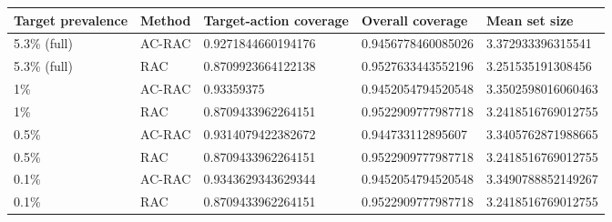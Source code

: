 \begin{tabular}{lllll}
\toprule
Target prevalence & Method & Target-action coverage & Overall coverage & Mean set size \\
\midrule
5.3\% (full) & AC-RAC & 0.9271844660194176 & 0.9456778460085026 & 3.372933396315541 \\
5.3\% (full) & RAC & 0.8709923664122138 & 0.9527633443552196 & 3.251535191308456 \\
1\% & AC-RAC & 0.93359375 & 0.9452054794520548 & 3.3502598016060463 \\
1\% & RAC & 0.8709433962264151 & 0.9522909777987718 & 3.2418516769012755 \\
0.5\% & AC-RAC & 0.9314079422382672 & 0.944733112895607 & 3.3405762871988665 \\
0.5\% & RAC & 0.8709433962264151 & 0.9522909777987718 & 3.2418516769012755 \\
0.1\% & AC-RAC & 0.9343629343629344 & 0.9452054794520548 & 3.3490788852149267 \\
0.1\% & RAC & 0.8709433962264151 & 0.9522909777987718 & 3.2418516769012755 \\
\bottomrule
\end{tabular}
